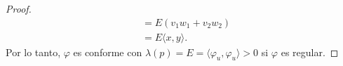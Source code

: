 \documentclass{article}
\begin{document}
\begin{proof}
\begin{align*}
                                                     & = E (v_1 w_1 + v_2 w_2)                                                                                                                                                                     \\
                                                     & = E \langle x, y \rangle.
    \end{align*}
    Por lo tanto, \( \varphi \) es conforme con \( \lambda(p) = E = \langle \varphi_u, \varphi_u \rangle > 0 \) si \( \varphi \) es regular.
\end{proof}
\end{document}
